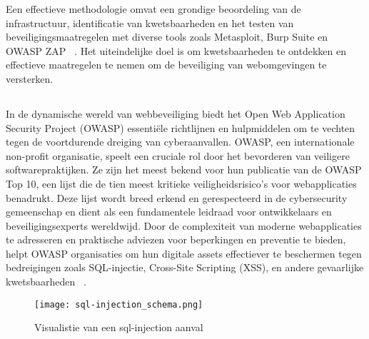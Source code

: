 Een effectieve methodologie omvat een grondige beoordeling van de infrastructuur, identificatie van kwetsbaarheden en het 
testen van beveiligingsmaatregelen met diverse tools zoals Metasploit, Burp Suite en OWASP ZAP ~\autocite{Ravindran2022}. 
Het uiteindelijke doel is om kwetsbaarheden te ontdekken en effectieve maatregelen te nemen om de beveiliging van webomgevingen 
te versterken.

\subsection{}
\label{sec:Veiligheidskwetsbaarheden in Webomgevingen}
In de dynamische wereld van webbeveiliging biedt het Open Web Application Security Project (OWASP) essentiële richtlijnen en hulpmiddelen om te vechten 
tegen de voortdurende dreiging van cyberaanvallen. OWASP, een internationale non-profit organisatie, speelt een cruciale rol door het bevorderen van 
veiligere softwarepraktijken. Ze zijn het meest bekend voor hun publicatie van de OWASP Top 10, een lijst die de tien meest kritieke veiligheidsrisico's 
voor webapplicaties benadrukt. Deze lijst wordt breed erkend en gerespecteerd in de cybersecurity gemeenschap en dient als een fundamentele leidraad 
voor ontwikkelaars en beveiligingsexperts wereldwijd. Door de complexiteit van moderne webapplicaties te adresseren en praktische adviezen voor 
beperkingen en preventie te bieden, helpt OWASP organisaties om hun digitale assets effectiever te beschermen tegen bedreigingen zoals SQL-injectie, 
Cross-Site Scripting (XSS), en andere gevaarlijke kwetsbaarheden ~\autocite{Priyawati2022}.
\begin{figure}
    \centering
    \texttt{[image: sql-injection\_schema.png]}
    \caption[Visualistie van een sql-injection aanval]{Visualistie van een sql-injection aanval}
\end{figure}
\subsubsection{}
\label{sec:SQL-injectie}

